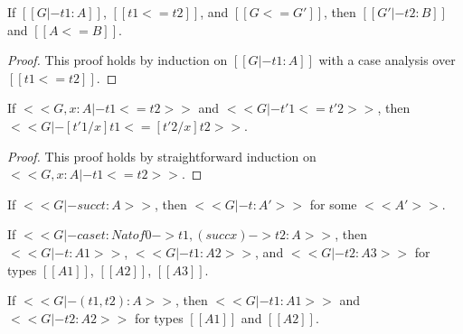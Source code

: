 \begin{lemma}
  \label{lemma:typing_for_type_precision}
  If $[[G |- t1 : A]]$, $[[t1 <= t2]]$, and $[[G <= G']]$, then $[[G' |- t2 : B]]$ and $[[A <= B]]$.
\end{lemma}
\begin{proof}
  This proof holds by induction on $[[G |- t1 : A]]$ with a case analysis over $[[t1 <= t2]]$.
\end{proof}

\begin{lemma}
  \label{lemma:substitution_for_term_precision}
  If $<<G, x : A |- t1 <= t2>>$ and $<<G |- t'1 <= t'2>>$, then $<<G |- [t'1/x]t1 <= [t'2/x]t2>>$.
\end{lemma}
\begin{proof}
  This proof holds by straightforward induction on $<<G, x : A |- t1 <= t2>>$.
\end{proof}

\begin{lemma}
  \label{lemma:typeability_inversion}
  \begin{enumR}
  \item[] 
  \item If $<<G |- succ t : A>>$, then $<<G |- t : A'>>$ for some $<<A'>>$.
  \item If $<<G |- case t : Nat of 0 -> t1, (succ x) -> t2 : A>>$, then $<<G |- t : A1>>$, $<<G |- t1 : A2>>$, and $<<G |- t2 : A3>>$
    for types $[[A1]]$, $[[A2]]$, $[[A3]]$.
  \item If $<<G |- (t1, t2) : A>>$, then $<<G |- t1 : A1>>$ and  $<<G |- t2 : A2>>$ for types $[[A1]]$ and $[[A2]]$.
  \end{enumR}
\end{lemma}

